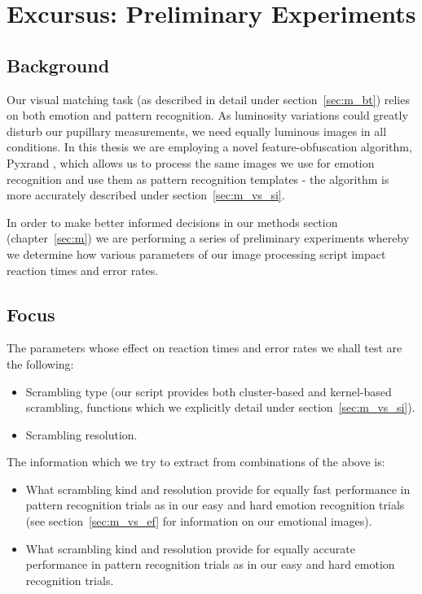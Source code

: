 \chapter{Excursus: Preliminary Experiments}\label{sec:pe}
    \section{Background}\label{sec:pa_s}
	Our visual matching task (as described in detail under section~\ref{sec:m_bt}) relies on both emotion and pattern recognition.
	As luminosity variations could greatly disturb our pupillary measurements, we need equally luminous images in all conditions.
	In this thesis we are employing a novel feature-obfuscation algorithm, Pyxrand \citep{pyxrand}, which allows us to process the same images we use for emotion recognition and use them as pattern recognition templates - the algorithm is more accurately described under section~\ref{sec:m_vs_si}.
	
	In order to make better informed decisions in our methods section (chapter~\ref{sec:m}) we are performing a series of preliminary experiments whereby we determine how various parameters of our image processing script impact reaction times and error rates.
    \section{Focus}
	The parameters whose effect on reaction times and error rates we shall test are the following:
	\begin{itemize}
	    \item Scrambling type (our script provides both cluster-based and kernel-based scrambling, functions which we explicitly detail under section~\ref{sec:m_vs_si}).
	    \item Scrambling resolution.
	\end{itemize}
	
	The information which we try to extract from combinations of the above is:
	\begin{itemize}
	    \item What scrambling kind and resolution provide for equally fast performance in pattern recognition trials as in our easy and hard emotion recognition trials (see section~\ref{sec:m_vs_ef} for information on our emotional images).
	    \item What scrambling kind and resolution provide for equally accurate performance in pattern recognition trials as in our easy and hard emotion recognition trials.
	\end{itemize}

